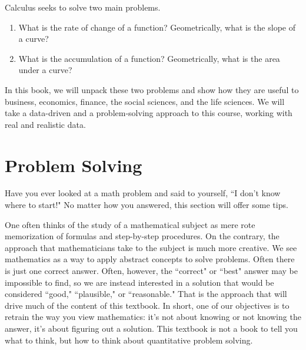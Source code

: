 Calculus seeks to solve two main problems.
\begin{enumerate}
    \item What is the rate of change of a function? Geometrically, what is the slope of a curve?
    \item What is the accumulation of a function? Geometrically, what is the area under a curve?
\end{enumerate}

In this book, we will unpack these two problems and show how they are useful to business, economics, finance, the social sciences, and the life sciences. We will take a data-driven and a problem-solving approach to this course, working with real and realistic data.

\section{Problem Solving}
\label{sec:polya}

Have you ever looked at a math problem and said to yourself, ``I don't know where to start!" No matter how you answered, this section will offer some tips.

One often thinks of the study of a mathematical subject as mere rote memorization of formulas and step-by-step procedures. On the contrary, the approach that mathematicians take to the subject is much more creative. We see mathematics as a way to apply abstract concepts to solve problems. Often there is just one correct answer. Often, however, the ``correct" or ``best" answer may be impossible to find, so we are instead interested in a solution that would be considered ``good," ``plausible," or ``reasonable." That is the approach that will drive much of the content of this textbook. In short, one of our objectives is to retrain the way you view mathematics: it's not about knowing or not knowing the answer, it's about figuring out a solution. This textbook is not a book to tell you what to think, but how to think about quantitative problem solving.

